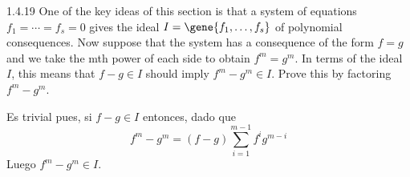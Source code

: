 \documentclass[twoside]{article}
\begin{document}
\begin{ejercicio}{1.4.19}
One of the key ideas of this section is that a system of equations $f_1 =\cdots = f_s = 0$ gives the ideal $I = \gene{ f_1,\dotsc, f_s}$ of polynomial consequences. Now suppose that the system has a consequence of the form $f = g$ and we take the mth power of each side to obtain $f^m = g^m$. In terms of the ideal $I$, this means that $f − g ∈ I$ should imply $f^m − g^m ∈ I$. Prove this by factoring $f^m − g^m$.
\end{ejercicio}
\begin{solucion}
Es trivial pues, si $f-g\in I$ entonces, dado que
$$
f^m-g^m = (f-g)\sum_{i=1}^{m-1}f^ig^{m-i}
$$
Luego $f^m-g^m \in I$.
\end{solucion}
\end{document}
